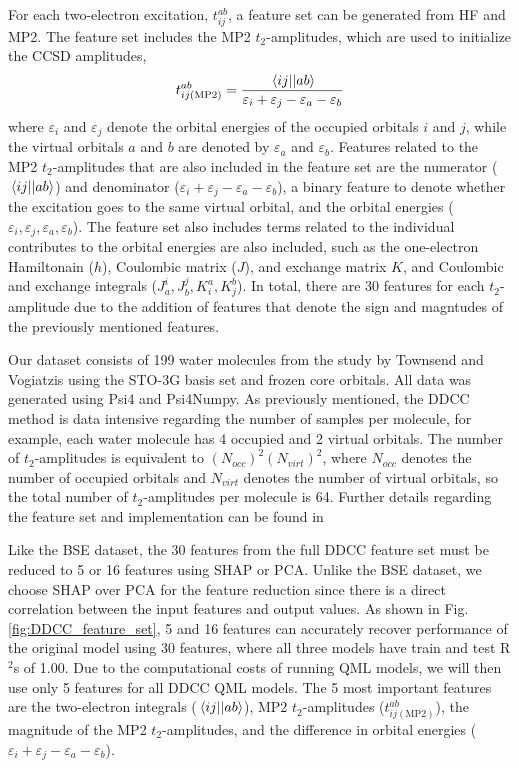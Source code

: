 \documentclass[journal=jacsat,manuscript=article]{achemso}
\begin{document}
For each two-electron excitation, $t^{ab}_{ij}$, a feature set can be generated from HF and MP2.
The feature set includes the MP2 $t_{2}$-amplitudes, which are used to initialize the CCSD amplitudes,
\begin{equation}
	t^{ab}_{ij(\text{MP2})} = \frac{\mel{ij}{}{ab}}{\varepsilon_{i}+\varepsilon_{j}-\varepsilon_{a}-\varepsilon_{b}}
	\label{eq:MP2_t2}
\end{equation}
where $\varepsilon_{i}$ and $\varepsilon_{j}$ denote the orbital energies of the occupied orbitals $i$ and $j$, while the virtual orbitals $a$ and $b$ are denoted by $\varepsilon_{a}$ and $\varepsilon_{b}$.
Features related to the MP2 $t_{2}$-amplitudes that are also included in the feature set are the numerator ($\mel{ij}{}{ab}$) and denominator ($\varepsilon_{i}+\varepsilon_{j}-\varepsilon_{a}-\varepsilon_{b}$), a binary feature to denote whether the excitation goes to the same virtual orbital, and the orbital energies ($\varepsilon_{i},\varepsilon_{j},\varepsilon_{a},\varepsilon_{b}$).
The feature set also includes terms related to the individual contributes to the orbital energies are also included, such as the one-electron Hamiltonain ($h$), Coulombic matrix ($J$), and exchange matrix $K$, and Coulombic and exchange integrals ($J^{i}_{a},J^{j}_{b},K^{a}_{i},K^{b}_{j}$).
In total, there are 30 features for each $t_{2}$-amplitude due to the addition of features that denote the sign and magntudes of the previously mentioned features.

Our dataset consists of 199 water molecules from the study by Townsend and Vogiatzis using the STO-3G basis set\cite{hehre_selfconsistent_1970} and frozen core orbitals.
All data was generated using Psi4\cite{parrish_psi4_2017} and Psi4Numpy\cite{smith_psi4numpy_2018}.
As previously mentioned, the DDCC method is data intensive regarding the number of samples per molecule, for example, each water molecule has 4 occupied and 2 virtual orbitals.
The number of $t_{2}$-amplitudes is equivalent to $(N_{occ})^{2}(N_{virt})^{2}$, where $N_{occ}$ denotes the number of occupied orbitals and $N_{virt}$ denotes the number of virtual orbitals, so the total number of $t_{2}$-amplitudes per molecule is 64.
Further details regarding the feature set and implementation can be found in \cite{townsend_data-driven_2019}

Like the BSE dataset, the 30 features from the full DDCC feature set must be reduced to 5 or 16 features using SHAP or PCA.
Unlike the BSE dataset, we choose SHAP over PCA for the feature reduction since there is a direct correlation between the input features and output values.
As shown in Fig. \ref{fig:DDCC_feature_set}, 5 and 16 features can accurately recover performance of the original model using 30 features, where all three models have train and test R$^{2}$s of 1.00.
Due to the computational costs of running QML models, we will then use only 5 features for all DDCC QML models.
The 5 most important features are the two-electron integrals ($\mel{ij}{}{ab}$), MP2 $t_{2}$-amplitudes ($t^{ab}_{ij(\text{MP2})}$), the magnitude of the MP2 $t_{2}$-amplitudes, and the difference in orbital energies ($\varepsilon_{i}+\varepsilon_{j}-\varepsilon_{a}-\varepsilon_{b}$).
\end{document}
